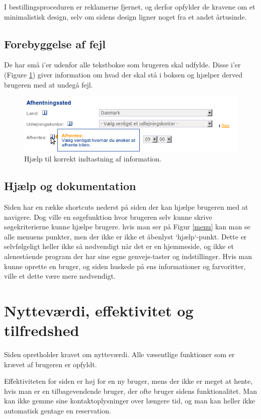 \documentclass[a4paper]{article}
\begin{document}
I bestillingsproceduren er reklamerne fjernet, og derfor opfylder de kravene om
et minimalistisk design, selv om sidens design ligner noget fra et andet
årtusinde.

\subsection{Forebyggelse af fejl}
De har små i'er udenfor alle tekstbokse som brugeren skal udfylde. Disse i'er (Figure \ref{help_kontaktinformation})
giver information om hvad der skal stå i boksen og hjælper derved brugeren med at
undegå fejl.

\begin{figure}[htbp]
  \begin{center}
    \includegraphics[scale=.6]{7.png}
  \end{center}
  \caption{Hjælp til korrekt indtastning af information.}
  \label{help_kontaktinformation}
\end{figure}

\subsection{Hjælp og dokumentation}
Siden har en række shortcuts nederst på siden der kan hjælpe brugeren med at
navigere. Dog ville en søgefunktion hvor brugeren selv kunne skrive søgekriterierne
kunne hjælpe brugere. hvis man ser på Figur \ref{menu} kan man se alle menuens 
punkter, men der ikke er ikke et åbenlyst `hjælp`-punkt. Dette er selvfølgeligt 
heller ikke så nødvendigt når det er en hjemmeside, og ikke et alenestående 
program der har sine egne genvejs-taster og indstillinger. Hvis man kunne oprette
en bruger, og siden huskede på ens informationer og farvoritter, ville et dette
være mere nødvendigt.

\section{Nytteværdi, effektivitet og tilfredshed}
Siden opretholder kravet om nytteværdi. Alle væsentlige funktioner som er krævet
af brugeren er opfyldt.

Effektiviteten for siden er høj for en ny bruger, mens der ikke er meget at
hente, hvis man er en tilbagevendende bruger, der ofte bruger sidens
funktionalitet. Man kan ikke gemme sine kontaktoplysninger over længere tid, og
man kan heller ikke automatisk gentage en reservation.
\end{document}
